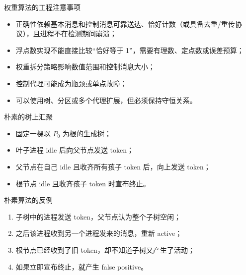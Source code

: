 \documentclass[UTF8,fontset=none,aspectratio=169,10pt]{beamer}
\begin{document}
\begin{frame}{权重算法的工程注意事项}
\begin{itemize}
  \item 正确性依赖基本消息和控制消息可靠送达、恰好计数（或具备去重/重传协议），且进程不在检测期间崩溃；
  \item 浮点数实现不能直接比较“恰好等于 1”，需要有理数、定点数或误差预算；
  \item 权重拆分策略影响数值范围和控制消息大小；
  \item 控制代理可能成为瓶颈或单点故障；
  \item 可以使用树、分区或多个代理扩展，但必须保持守恒关系。
\end{itemize}
\vfill
{}
\end{frame}


\begin{frame}{朴素的树上汇聚}
\begin{itemize}
  \item 固定一棵以 $P_0$ 为根的生成树；
  \item 叶子进程 idle 后向父节点发送 token；
  \item 父节点在自己 idle 且收齐所有孩子 token 后，向上发送 token；
  \item 根节点 idle 且收齐孩子 token 时宣布终止。
\end{itemize}
\begin{center}
\end{center}
\end{frame}

\begin{frame}{朴素算法的反例}
\begin{enumerate}
  \item 子树中的进程发送 token，父节点认为整个子树空闲；
  \item 之后该进程收到另一个进程发来的消息，重新 active；
  \item 根节点已经收到了旧 token，却不知道子树又产生了活动；
  \item 如果立即宣布终止，就产生 false positive。
\end{enumerate}
\vfill
{}
\end{frame}
\end{document}
